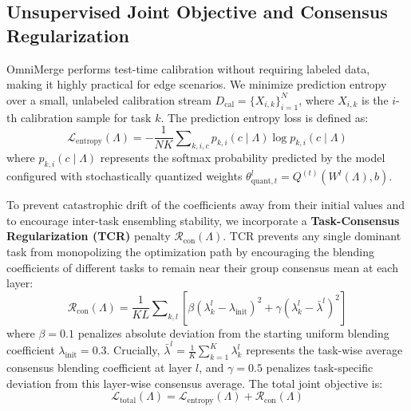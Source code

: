 \subsection{Unsupervised Joint Objective and Consensus Regularization}
OmniMerge performs test-time calibration without requiring labeled data, making it highly practical for edge scenarios. We minimize prediction entropy over a small, unlabeled calibration stream $D_{\text{cal}} = \{X_{i, k}\}_{i=1}^N$, where $X_{i, k}$ is the $i$-th calibration sample for task $k$. The prediction entropy loss is defined as:
\begin{equation}
    \mathcal{L}_{\text{entropy}}(\Lambda) = -\frac{1}{N K} \sum\nolimits_{k, i, c} p_{k, i}(c \mid \Lambda) \log p_{k, i}(c \mid \Lambda)
\end{equation}
where $p_{k, i}(c \mid \Lambda)$ represents the softmax probability predicted by the model configured with stochastically quantized weights $\theta^l_{\text{quant}, t} = Q^{(t)}(W^l(\Lambda), b)$.

To prevent catastrophic drift of the coefficients away from their initial values and to encourage inter-task ensembling stability, we incorporate a \textbf{Task-Consensus Regularization (TCR)} penalty $\mathcal{R}_{\text{con}}(\Lambda)$. TCR prevents any single dominant task from monopolizing the optimization path by encouraging the blending coefficients of different tasks to remain near their group consensus mean at each layer:
\begin{equation}
    \mathcal{R}_{\text{con}}(\Lambda) = \frac{1}{K L} \sum\nolimits_{k, l} \left[ \beta (\lambda^l_k - \lambda_{\text{init}})^2 + \gamma (\lambda^l_k - \bar{\lambda}^l)^2 \right]
\end{equation}
where $\beta = 0.1$ penalizes absolute deviation from the starting uniform blending coefficient $\lambda_{\text{init}} = 0.3$. Crucially, $\bar{\lambda}^l = \frac{1}{K} \sum_{k=1}^K \lambda^l_k$ represents the task-wise average consensus blending coefficient at layer $l$, and $\gamma = 0.5$ penalizes task-specific deviation from this layer-wise consensus average. The total joint objective is:
\begin{equation}
    \mathcal{L}_{\text{total}}(\Lambda) = \mathcal{L}_{\text{entropy}}(\Lambda) + \mathcal{R}_{\text{con}}(\Lambda)
\end{equation}

